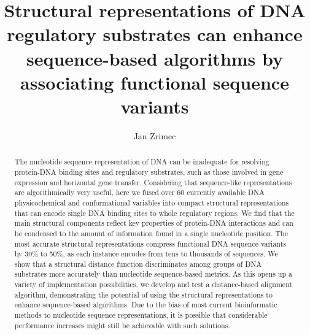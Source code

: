 \documentclass[sigconf]{acmart}
\begin{document}
\title[Structural representations of DNA regulatory substrates]{Structural representations of DNA regulatory substrates can enhance sequence-based algorithms by associating functional sequence variants}

\author{Jan Zrimec}

\renewcommand{\shortauthors}{Zrimec J.}

\begin{abstract}
  The nucleotide sequence representation of DNA can be inadequate for resolving protein-DNA binding sites and regulatory substrates, such as those involved in gene expression and horizontal gene transfer. Considering that sequence-like representations are algorithmically very useful, here we fused over 60 currently available DNA physicochemical and conformational variables into compact structural representations that can encode single DNA binding sites to whole regulatory regions. We find that the main structural components reflect key properties of protein-DNA interactions and can be condensed to the amount of information found in a single nucleotide position. The most accurate structural representations compress functional DNA sequence variants by 30\% to 50\%, as each instance encodes from tens to thousands of sequences. We show that a structural distance function discriminates among groups of DNA substrates more accurately than nucleotide sequence-based metrics. As this opens up a variety of implementation possibilities, we develop and test a distance-based alignment algorithm, demonstrating the potential of using the structural representations to enhance sequence-based algorithms. Due to the bias of most current bioinformatic methods to nucleotide sequence representations, it is possible that considerable performance increases might still be achievable with such solutions.
\end{abstract}
\end{document}
